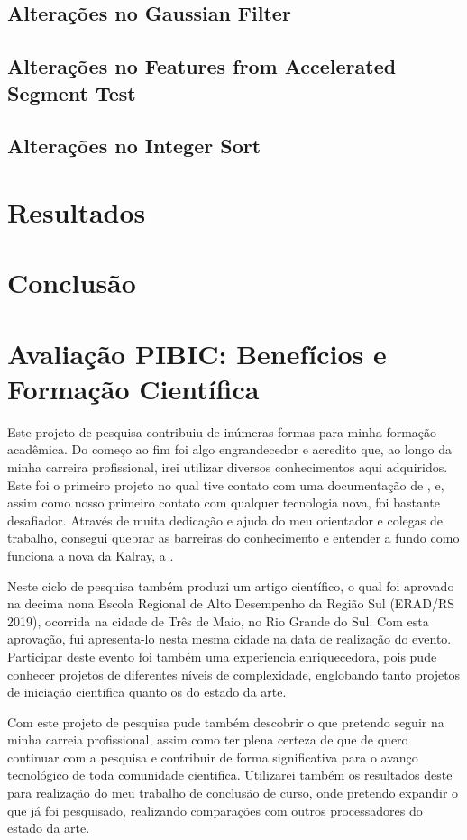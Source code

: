\documentclass[a4paper,11pt]{article}
\begin{document}
\subsection{Alterações no Gaussian Filter}
\label{subsec:async}

\subsection{Alterações no Features from Accelerated Segment Test}
\label{subsec:async}

\subsection{Alterações no Integer Sort}
\label{subsec:async}

\section{Resultados}
\label{sec:resultados}

\section{Conclusão}
\label{sec:conclusao}



\section{Avaliação PIBIC: Benefícios e Formação Científica}

Este projeto de pesquisa contribuiu de inúmeras formas para minha formação acadêmica. Do começo ao fim foi algo engrandecedor e acredito que, ao longo da minha carreira profissional, irei utilizar diversos conhecimentos aqui adquiridos. Este foi o primeiro projeto no qual tive contato com uma documentação de \api, e, assim como nosso primeiro contato com qualquer tecnologia nova, foi bastante desafiador. Através de muita dedicação e ajuda do meu orientador e colegas de trabalho, consegui quebrar as barreiras do conhecimento e entender a fundo como funciona a nova \api da Kalray, a \async.  

Neste ciclo de pesquisa também produzi um artigo científico, o qual foi aprovado na decima nona Escola Regional de Alto Desempenho da Região Sul (ERAD/RS 2019), ocorrida na cidade de Três de Maio, no Rio Grande do Sul. Com esta aprovação, fui apresenta-lo nesta mesma cidade na data de realização do evento. Participar deste evento foi também uma experiencia enriquecedora, pois pude conhecer projetos de diferentes níveis de complexidade, englobando tanto projetos de iniciação cientifica quanto os do estado da arte.

Com este projeto de pesquisa pude também descobrir o que pretendo seguir na minha carreia profissional, assim como ter plena certeza de que de quero continuar com a pesquisa e contribuir de forma significativa para o avanço tecnológico de toda comunidade cientifica. Utilizarei também os resultados deste para realização do meu trabalho de conclusão de curso, onde pretendo expandir o que já foi pesquisado, realizando comparações com outros processadores do estado da arte.
 
 

\end{document}
